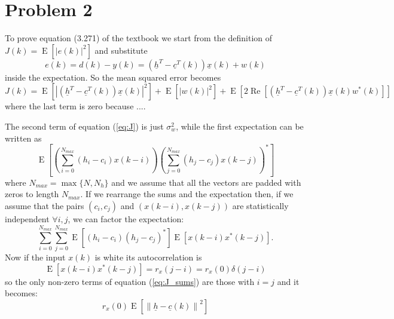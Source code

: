 \documentclass{article}
\renewcommand{\vec}[1]{\underline{#1}}
\renewcommand{\Re}[1]{\operatorname{Re}\left[#1\right]}
\newcommand{\E}[1]{\operatorname{E}\left[#1\right]}
\newcommand{\norm}[1]{\left\lVert#1\right\rVert}
\newcommand{\abs}[1]{\left|#1\right|}
\begin{document}
\section*{Problem 2}
To prove equation (3.271) of the textbook we start from the definition
of $J(k) = \E{\abs{e(k)}^2}$ and substitute
\[ e(k) = d(k) - y(k) = \left(\vec{h}^T - \vec{c}^T(k) \right) \vec{x}(k) + w(k) \]
inside the expectation. So the mean squared error becomes
\begin{equation}
  J(k) = \E{\abs{\left(\vec{h}^T - \vec{c}^T(k) \right) \vec{x}(k)}^2}
  + \E{\abs{w(k)}^2}
  + \E{2\Re{\left(\vec{h}^T - \vec{c}^T(k) \right) \vec{x}(k) w^*(k)}}
  \label{eq:J}
\end{equation}
{\color{red} where the last term is zero because ...}.

The second term of equation (\ref{eq:J}) is just $\sigma^2_w$, while
the first expectation can be written as
\[ \E{
  \left(\sum_{i=0}^{N_{max}}\left(h_i - c_i\right)x(k-i)\right)
  \left(\sum_{j=0}^{N_{max}}\left(h_j - c_j\right)x(k-j)\right)^* } \]
where $N_{max} = \max\{N, N_h\}$ and we assume that all the vectors
are padded with zeros to length $N_{max}$.  If we rearrange the sums
and the expectation then, {\color{red} if we assume that the pairs
  $(c_i,c_j)$ and $(x(k-i),x(k-j))$ are statistically independent
  $\forall i,j$}, we can factor the expectation:
\begin{equation}
\sum_{i=0}^{N_{max}}\sum_{j=0}^{N_{max}}
\E{(h_i -c_i)(h_j-c_j)^*}
\E{x(k-i)x^*(k-j)} .
\label{eq:J_sums}
\end{equation}
Now if the input $x(k)$ is white its autocorrelation is
\[
\E{x(k-i)x^*(k-j)} = r_x(j-i) = r_x(0)\delta(j-i)
\]
so the only non-zero terms of equation (\ref{eq:J_sums}) are those
with $i=j$ and it becomes:
\begin{equation}
  r_x(0)\E{\norm{\vec{h}-\vec{c}(k)}^2}
  \label{eq:J_final_diff}
\end{equation}
\end{document}
